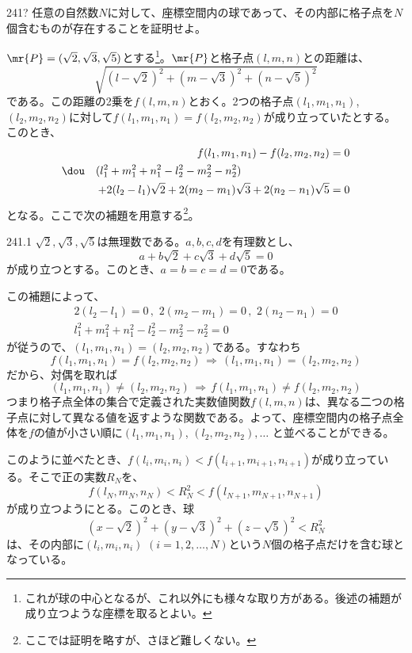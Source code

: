 \begin{thm}{241}{\hosi ?}{}
 任意の自然数$N$に対して、座標空間内の球であって、その内部に格子点を$N$個含むものが存在することを証明せよ。
\end{thm}

$\mr{P}=(\sqrt{2}, \sqrt{3}, \sqrt{5})$とする\footnote{これが球の中心となるが、これ以外にも様々な取り方がある。後述の補題が成り立つような座標を取るとよい。}。$\mr{P}$と格子点$(l,m,n)$との距離は、
\[ \sqrt{(l-\sqrt{2})^2+(m-\sqrt{3})^2+(n-\sqrt{5})^2} \]
である。この距離の2乗を$f(l,m,n)$とおく。2つの格子点$(l_1,m_1,n_1)$, $(l_2,m_2,n_2)$に対して$f(l_1,m_1,n_1)=f(l_2,m_2,n_2)$が成り立っていたとする。このとき、
\begin{align*}
 f(l_1,m_1,n_1)-f(l_2,m_2,n_2)&=0 \\
 \dou\quad (l_1^2+m_1^2+n_1^2-l_2^2-m_2^2-n_2^2) \qquad\qquad\qquad\qquad & \\
  + 2(l_2-l_1)\sqrt{2}+2(m_2-m_1)\sqrt{3}+2(n_2-n_1)\sqrt{5}&=0
\end{align*}
となる。ここで次の補題を用意する\footnote{ここでは証明を略すが、さほど難しくない。}。
\begin{subthm}{241.1}
 $\sqrt{2}, \sqrt{3}, \sqrt{5}$は無理数である。$a, b, c, d$を有理数とし、
 \[ a+b\sqrt{2}+c\sqrt{3}+d\sqrt{5}=0 \]
 が成り立つとする。このとき、$a=b=c=d=0$である。
\end{subthm}
この補題によって、
\begin{align*}
 2(l_2-l_1)=0 \,,\,\, 2(m_2-m_1)=0 \,,\,\, 2(n_2-n_1)=0 \\
 l_1^2+m_1^2+n_1^2-l_2^2-m_2^2-n_2^2=0
\end{align*}
が従うので、$(l_1, m_1, n_1)=(l_2, m_2, n_2)$である。すなわち
\[ f(l_1, m_1, n_1)=f(l_2, m_2, n_2) \,\Rightarrow\, (l_1, m_1, n_1)=(l_2, m_2, n_2) \]
だから、対偶を取れば
\[ (l_1, m_1, n_1)\neq (l_2, m_2, n_2) \,\Rightarrow\, f(l_1, m_1, n_1)\neq f(l_2, m_2, n_2) \]
つまり格子点全体の集合で定義された実数値関数$f(l,m,n)$は、異なる二つの格子点に対して異なる値を返すような関数である。よって、座標空間内の格子点全体を$f$の値が小さい順に$(l_1, m_1, n_1)$, $(l_2, m_2, n_2), \ldots$ と並べることができる。

このように並べたとき、$f(l_i, m_i, n_i) < f(l_{i+1}, m_{i+1}, n_{i+1})$が成り立っている。そこで正の実数$R_N$を、
\[ f(l_N, m_N, n_N) < R_N^2 < f(l_{N+1}, m_{N+1}, n_{N+1}) \]
が成り立つようにとる。このとき、球
\[ (x-\sqrt{2})^2+(y-\sqrt{3})^2+(z-\sqrt{5})^2 < R_N^2 \]
は、その内部に$(l_i, m_i, n_i)$ $(i=1,2,\dots,N)$という$N$個の格子点だけを含む球となっている。